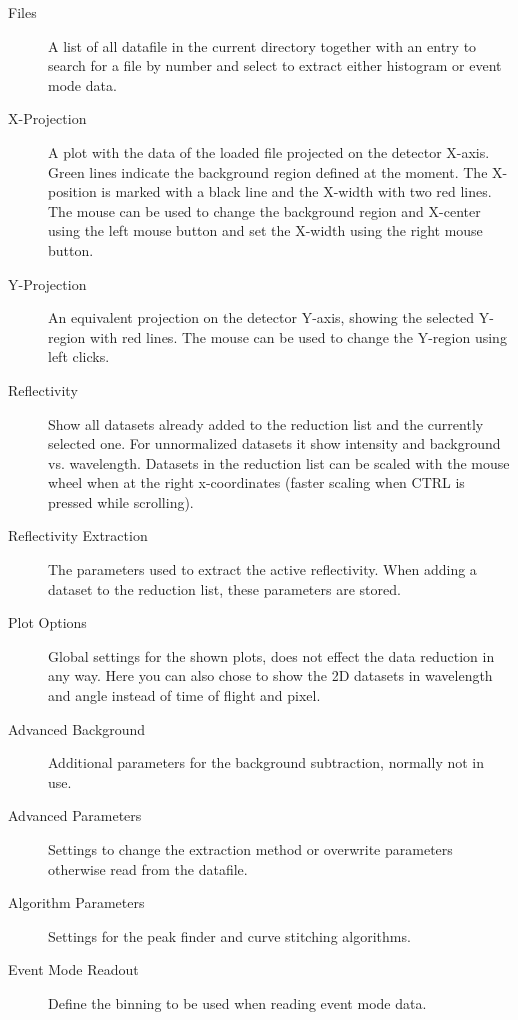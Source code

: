   \begin{description}
   \item[Files] A list of all datafile in the current directory together with an entry to search for a file by number and select to extract either histogram or event mode data.
   
   \item[X-Projection] A plot with the data of the loaded file projected on the detector X-axis. Green lines indicate the background region defined at the moment. The X-position is marked with a black line and the X-width with two red lines. The mouse can be used to change the background region and X-center using the left mouse button and set the X-width using the right mouse button.
   \item[Y-Projection] An equivalent projection on the detector Y-axis, showing the selected Y-region with red lines. The mouse can be used to change the Y-region using left clicks.
   
   \item[Reflectivity] Show all datasets already added to the reduction list and the currently selected one. For unnormalized datasets it show intensity and background vs. wavelength. Datasets in the reduction list can be scaled with the mouse wheel when at the right x-coordinates (faster scaling when CTRL is pressed while scrolling).
   
   \item[Reflectivity Extraction] The parameters used to extract the active reflectivity. When adding a dataset to the reduction list, these parameters are stored.
   \item[Plot Options] Global settings for the shown plots, does not effect the data reduction in any way. Here you can also chose to show the 2D datasets in wavelength and angle instead of time of flight and pixel.
   
   \item[Advanced Background] Additional parameters for the background subtraction, normally not in use.
   \item[Advanced Parameters] Settings to change the extraction method or overwrite parameters otherwise read from the datafile.
   \item[Algorithm Parameters] Settings for the peak finder and curve stitching algorithms.
   \item[Event Mode Readout] Define the binning to be used when reading event mode data.
  \end{description}

